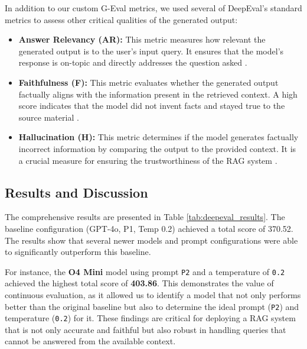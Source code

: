 In addition to our custom G-Eval metrics, we used several of DeepEval's standard metrics to assess other critical qualities of the generated output:
\begin{itemize}
    \item \textbf{Answer Relevancy (AR):} This metric measures how relevant the generated output is to the user's input query. It ensures that the model's response is on-topic and directly addresses the question asked \autocite{deepeval2023}.
    \item \textbf{Faithfulness (F):} This metric evaluates whether the generated output factually aligns with the information present in the retrieved context. A high score indicates that the model did not invent facts and stayed true to the source material \autocite{deepeval2023}.
    \item \textbf{Hallucination (H):} This metric determines if the model generates factually incorrect information by comparing the output to the provided context. It is a crucial measure for ensuring the trustworthiness of the RAG system \autocite{deepeval2023}.
\end{itemize}


\subsection{Results and Discussion}
The comprehensive results are presented in Table \ref{tab:deepeval_results}. The baseline configuration (GPT-4o, P1, Temp 0.2) achieved a total score of 370.52. The results show that several newer models and prompt configurations were able to significantly outperform this baseline.

For instance, the \textbf{O4 Mini} model using prompt \texttt{P2} and a temperature of \texttt{0.2} achieved the highest total score of \textbf{403.86}. This demonstrates the value of continuous evaluation, as it allowed us to identify a model that not only performs better than the original baseline but also to determine the ideal prompt (\texttt{P2}) and temperature (\texttt{0.2}) for it. These findings are critical for deploying a RAG system that is not only accurate and faithful but also robust in handling queries that cannot be answered from the available context.

